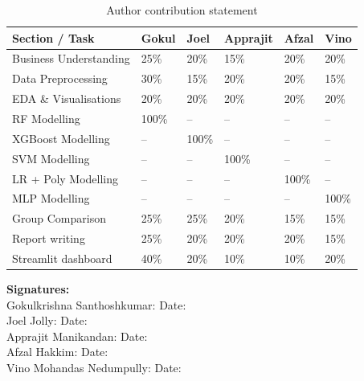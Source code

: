\documentclass[12pt,a4paper]{article}
\begin{document}
\begin{table}[H]
  \centering
  \caption{Author contribution statement}
  \label{tab:contributions}
  \begin{tabular}{L{5cm} C{1.5cm} C{1.5cm} C{1.5cm} C{1.5cm} C{1.5cm}}
    \toprule
    \textbf{Section / Task} & \textbf{Gokul} & \textbf{Joel} & \textbf{Apprajit} & \textbf{Afzal} & \textbf{Vino} \\
    \midrule
    Business Understanding  & 25\% & 20\% & 15\% & 20\% & 20\% \\
    Data Preprocessing      & 30\% & 15\% & 20\% & 20\% & 15\% \\
    EDA \& Visualisations   & 20\% & 20\% & 20\% & 20\% & 20\% \\
    RF Modelling            & 100\% & -- & -- & -- & -- \\
    XGBoost Modelling       & -- & 100\% & -- & -- & -- \\
    SVM Modelling           & -- & -- & 100\% & -- & -- \\
    LR + Poly Modelling     & -- & -- & -- & 100\% & -- \\
    MLP Modelling           & -- & -- & -- & -- & 100\% \\
    Group Comparison        & 25\% & 25\% & 20\% & 15\% & 15\% \\
    Report writing          & 25\% & 20\% & 20\% & 20\% & 15\% \\
    Streamlit dashboard     & 40\% & 20\% & 10\% & 10\% & 20\% \\
    \bottomrule
  \end{tabular}
\end{table}

\noindent\textbf{Signatures:}\\[12pt]
Gokulkrishna Santhoshkumar: \underline{\hspace{5cm}} Date: \underline{\hspace{3cm}}\\[8pt]
Joel Jolly: \underline{\hspace{5cm}} Date: \underline{\hspace{3cm}}\\[8pt]
Apprajit Manikandan: \underline{\hspace{5cm}} Date: \underline{\hspace{3cm}}\\[8pt]
Afzal Hakkim: \underline{\hspace{5cm}} Date: \underline{\hspace{3cm}}\\[8pt]
Vino Mohandas Nedumpully: \underline{\hspace{5cm}} Date: \underline{\hspace{3cm}}
\end{document}
